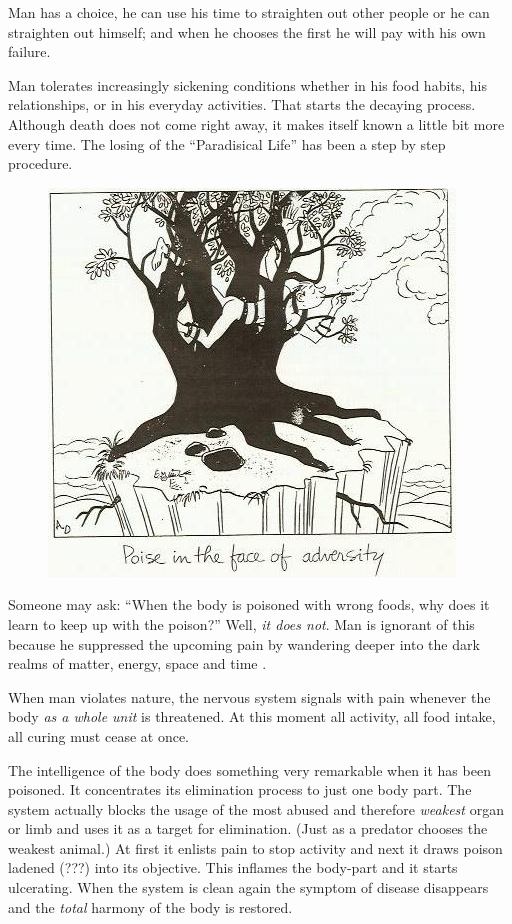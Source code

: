 \documentclass[12pt,letterpaper]{article}
\newcommand{\mest}{matter, energy, space and time }
\begin{document}
Man has a choice, he can use his time to straighten out other people
or he can straighten out himself; and when he chooses the first he
will pay with his own failure.

Man tolerates increasingly sickening conditions whether in his food
habits, his relationships, or in his everyday activities. That starts
the decaying process. Although death does not come right away, it
makes itself known a little bit more every time. The losing of the
``Paradisical Life'' has been a step by step procedure.

\begin{figure} \centering
  \includegraphics[height=0.75\textheight]{p21.jpg}
\end{figure}



Someone may ask: ``When the body is poisoned with wrong foods, why
does it learn to keep up with the poison?'' Well, \emph{it does
not}. Man is ignorant of this because he suppressed the upcoming pain
by wandering deeper into the dark realms of \mest.

When man violates nature, the nervous system signals with pain
whenever the body \emph{as a whole unit} is threatened. At this moment
all activity, all food intake, all curing must cease at once.

The intelligence of the body does something very remarkable when it
has been poisoned. It concentrates its elimination process to just one
body part. The system actually blocks the usage of the most abused and
therefore \emph{weakest} organ or limb and uses it as a target for
elimination. (Just as a predator chooses the weakest animal.) At first
it enlists pain to stop activity and next it draws poison ladened
(???) into its objective. This inflames the body-part and it starts
ulcerating. When the system is clean again the symptom of disease
disappears and the \emph{total} harmony of the body is restored.
\end{document}
